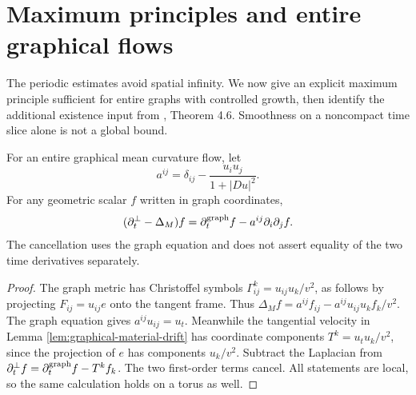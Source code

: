 \chapter{Maximum principles and entire graphical flows}\label{sec:entire-graphical-flow}
The periodic estimates avoid spatial infinity. We now give an explicit maximum principle sufficient for entire graphs with controlled growth, then identify the additional existence input from \cite{EH89}, Theorem 4.6. Smoothness on a noncompact time slice alone is not a global bound.

\begin{lemma}\label{lem:graphical-heat-coordinate-cancellation}
For an entire graphical mean curvature flow, let
\[
 a^{ij}=\delta_{ij}-\frac{u_i u_j}{1+|Du|^2}.
\]
For any geometric scalar $f$ written in graph coordinates,
\[
 (\partial_t^\perp-\Delta_M)f
       =\partial_t^{\rm graph}f-a^{ij}\partial_i\partial_j f.
\]
The cancellation uses the graph equation and does not assert equality of the two time derivatives separately.
\end{lemma}
\begin{proof}
The graph metric has Christoffel symbols $\Gamma^k_{ij}=u_{ij}u_k/v^2$, as follows by projecting $F_{ij}=u_{ij}e$ onto the tangent frame. Thus
$\Delta_M f=a^{ij}f_{ij}-a^{ij}u_{ij}u_kf_k/v^2$.
The graph equation gives $a^{ij}u_{ij}=u_t$. Meanwhile the tangential velocity in Lemma \ref{lem:graphical-material-drift} has coordinate components $T^k=u_tu_k/v^2$, since the projection of $e$ has components $u_k/v^2$. Subtract the Laplacian from $\partial_t^\perp f=\partial_t^{\rm graph}f-T^kf_k$. The two first-order terms cancel. All statements are local, so the same calculation holds on a torus as well.
\end{proof}

